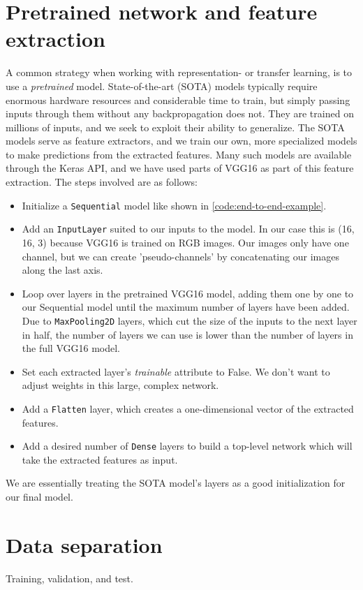 \section{Pretrained network and feature extraction}\label{sec:method-pretrained}
A common strategy when working with representation- or transfer learning,
is to use a \textit{pretrained} model. State-of-the-art (SOTA) models typically
require enormous hardware resources and considerable time to train,
but simply passing inputs through them without any backpropagation does not.
They are trained on millions of inputs, and we seek to exploit their ability to
generalize. The SOTA models serve as feature extractors, and we train our own,
more specialized models to make predictions from the extracted features.
Many such models are available through the Keras API, and we have used
parts of VGG16 \cite{Simonyan2015} as part of this feature extraction.
The steps involved are as follows:
\begin{itemize}
    \item Initialize a \lstinline{Sequential} model like shown in \ref{code:end-to-end-example}.
    \item Add an \lstinline{InputLayer} suited to our inputs to the model. In our case this is
    (16, 16, 3) because VGG16 is trained on RGB images. Our images only have one channel, but we 
    can create 'pseudo-channels' by concatenating our images along the last axis.
    \item Loop over layers in the pretrained VGG16 model, adding them one by one to
    our Sequential model until the maximum number of layers have been added.
    Due to \lstinline{MaxPooling2D} layers, which cut the size of the inputs to the
    next layer in half, the number of layers we can use is lower than the number of layers
    in the full VGG16 model.
    \item Set each extracted layer's \textit{trainable} attribute to False. We don't want
    to adjust weights in this large, complex network.
    \item Add a \lstinline{Flatten} layer, which creates a one-dimensional vector of the
    extracted features.
    \item Add a desired number of \lstinline{Dense} layers to build a top-level network
    which will take the extracted features as input.
\end{itemize}
We are essentially treating the SOTA model's layers as a good initialization for our
final model.

\section{Data separation}
Training, validation, and test.